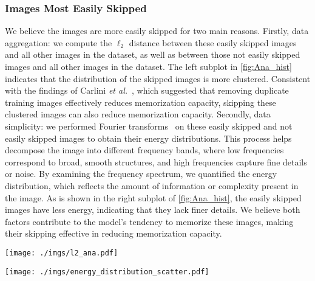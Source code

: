 \subsubsection{Images Most Easily Skipped}
We believe the images are more easily skipped for two main reasons.
Firstly, data aggregation: we compute the $\ell_{2}$ distance between these easily skipped images and all other images in the dataset, as well as between those not easily skipped images and all other images in the dataset.
The left subplot in \cref{fig:Ana_hist} indicates that the distribution of the skipped images is more clustered.
Consistent with the findings of Carlini \MakeLowercase{\textit{et al.}}~\cite{carlini2023extracting}, which suggested that removing duplicate training images effectively reduces memorization capacity, skipping these clustered images can also reduce memorization capacity.
Secondly, data simplicity: we performed Fourier transforms~\cite{sneddon1995fourier} on these easily skipped and not easily skipped images to obtain their energy distributions. This process helps decompose the image into different frequency bands, where low frequencies correspond to broad, smooth structures, and high frequencies capture fine details or noise. By examining the frequency spectrum, we quantified the energy distribution, which reflects the amount of information or complexity present in the image. As is shown in the right subplot of \cref{fig:Ana_hist},
the easily skipped images have less energy, indicating that they lack finer details.
We believe both factors contribute to the model’s tendency to memorize these images, making their skipping effective in reducing memorization capacity.
\begin{figure*}[tb]
  \setlength{\abovecaptionskip}{0pt} %
  \setlength{\belowcaptionskip}{-7pt} %
  \centering
  \begin{minipage}{0.43\linewidth}
    \texttt{[image: ./imgs/l2\_ana.pdf]}
    \label{fig: Ana_l2_most_least}
  \end{minipage}
  \begin{minipage}{0.43\linewidth}
    \texttt{[image: ./imgs/energy\_distribution\_scatter.pdf]}
    \label{fig: Ana_spec}
  \end{minipage}
  \caption{The data distribution analysis of images skipped most and images skipped least. The left subplot shows the distribution of distances to the most similar images in the dataset. The right subplot displays energy distribution. The greater the energy, the more complex the image.}
  \label{fig:Ana_hist}
\end{figure*}


